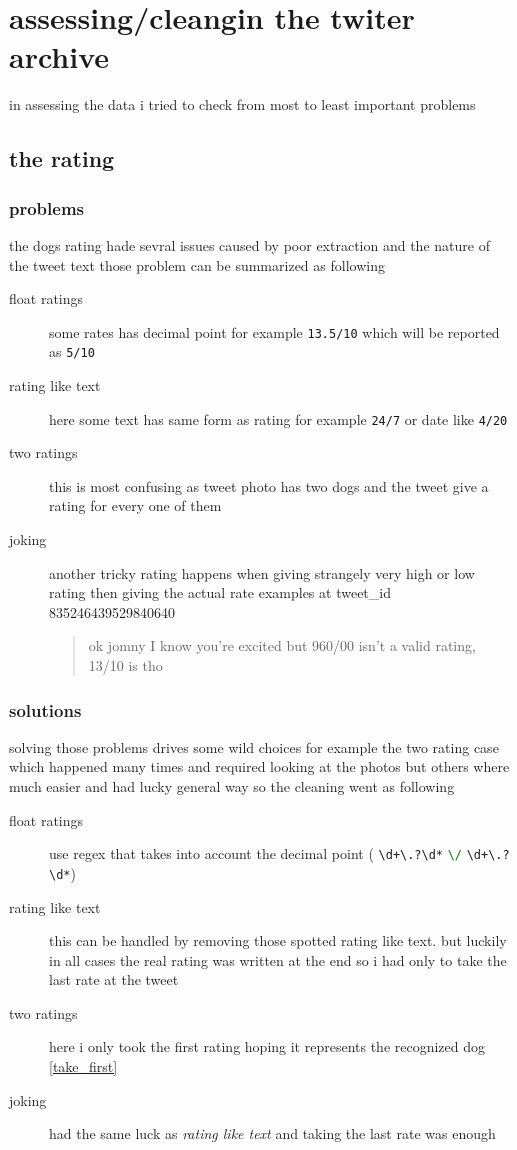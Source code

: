 \documentclass{article}
\begin{document}
\section{assessing/cleangin the twiter archive}
in assessing the data i tried to check from most to least important problems
\subsection{the rating}
\subsubsection{problems}
the dogs rating hade sevral issues caused by poor extraction and the nature of the tweet text 
those problem can be summarized as following
\begin{description}
	\item[float ratings ] some rates has decimal point for example 
	\lstinline{13.5/10} which will be reported as \lstinline{5/10}
	\item[rating like text] here some text has same form as rating for example \lstinline{24/7} or date like  \lstinline{4/20}
	\item[two ratings] this is most confusing as tweet photo has two dogs and the tweet give a rating for every one of them
	\item[joking] another tricky rating happens when giving strangely very high or low rating 
	then giving the actual rate examples at tweet\_id 835246439529840640
	\begin{quote}
		ok jomny I know you're excited 
		but 960/00 isn't a valid rating, 13/10 is tho	
	\end{quote}
\end{description}
\subsubsection{solutions}
solving those problems drives some wild choices for example the two rating case which  happened 
many times and required looking at the photos but others where much easier and had lucky general way so the cleaning went as following
\begin{description}
	
	\item[float ratings ] use regex that takes into account the decimal point \newline
	({\color{red} \lstinline{\d+\.?\d*}}
	\textcolor{green}{\lstinline{\/}}
	{\color{red} \lstinline{\d+\.?\d*}})
	\item[rating like text] this can be handled by removing those spotted rating like text.
	but luckily in all cases the real rating was written at the end so i had only to take the last 
	rate at the tweet 
	\item[two ratings] here i only took the first rating hoping it represents the recognized dog \ref{take_first}
	\item[joking] had the same luck as\emph{ rating like text} and taking the last rate was enough 
\end{description}
\end{document}

